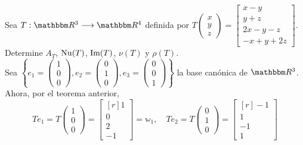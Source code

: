 \begin{example}
    Sea $T:\RR[3] \longrightarrow \RR[4]$ definida por $T \begin{pmatrix}
        x \\
        y \\
        z
    \end{pmatrix} = \begin{bmatrix}
        x - y \\
        y + z \\
        2x - y - z \\
        - x + y + 2z
    \end{bmatrix}$. Determine $A_T$, $\Nuc(T)$, $\Ima(T)$, $\nu(T)$ y $\rho(T)$. \\
    \solucion Sea $\left\{ e_1 = \begin{pmatrix}
        1 \\
        0 \\
        0
    \end{pmatrix},  e_2 = \begin{pmatrix}
        0 \\
        1 \\
        0
    \end{pmatrix},  e_3 = \begin{pmatrix}
        0 \\
        0 \\
        1
    \end{pmatrix} \right\}$ la base canónica de $\RR[3]$. Ahora, por el teorema anterior,
    $$Te_1 = T\begin{pmatrix}
        1 \\
        0 \\
        0
    \end{pmatrix} = \begin{bmatrix*}[r]
        1 \\
        0 \\
        2 \\
        -1
    \end{bmatrix*} = \mathbb{w}_1, \quad Te_2 = T\begin{pmatrix}
        0 \\
        1 \\
        0
    \end{pmatrix} = \begin{bmatrix*}[r]
        -1 \\
        1 \\
        -1 \\
        1

\end{bmatrix*}$$
\end{example}
